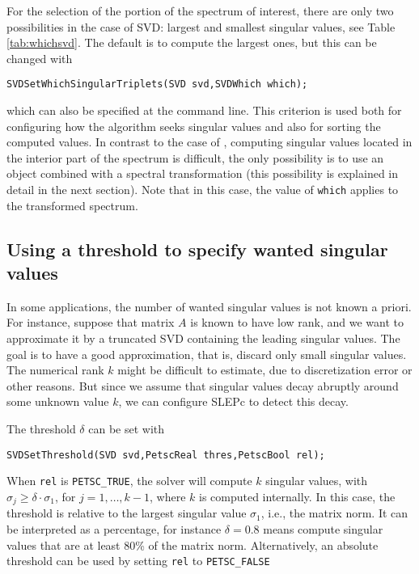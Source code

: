 For the selection of the portion of the spectrum of interest, there are only two possibilities in the case of SVD: largest and smallest singular values, see Table \ref{tab:whichsvd}. The default is to compute the largest ones, but this can be changed with
        \begin{Verbatim}[fontsize=\small]
        SVDSetWhichSingularTriplets(SVD svd,SVDWhich which);
        \end{Verbatim}
which can also be specified at the command line. This criterion is used both for configuring how the algorithm seeks singular values and also for sorting the computed values. In contrast to the case of , computing singular values located in the interior part of the spectrum is difficult, the only possibility is to use an  object combined with a spectral transformation (this possibility is explained in detail in the next section). Note that in this case, the value of \Verb!which! applies to the transformed spectrum.

\subsection{\label{sec:thres}Using a threshold to specify wanted singular values}

In some applications, the number of wanted singular values is not known a priori. For instance, suppose that matrix $A$ is known to have low rank, and we want to approximate it by a truncated SVD containing the leading singular values. The goal is to have a good approximation, that is, discard only small singular values. The numerical rank $k$ might be difficult to estimate, due to discretization error or other reasons. But since we assume that singular values decay abruptly around some unknown value $k$, we can configure SLEPc to detect this decay.

The threshold $\delta$ can be set with
        \begin{Verbatim}[fontsize=\small]
        SVDSetThreshold(SVD svd,PetscReal thres,PetscBool rel);
        \end{Verbatim}
When \texttt{rel} is \texttt{PETSC\_TRUE}, the solver will compute $k$ singular values, with $\sigma_j\geq\delta\cdot\sigma_1$, for $j=1,\dots,k-1$, where $k$ is computed internally. In this case, the threshold is relative to the largest singular value $\sigma_1$, i.e., the matrix norm. It can be interpreted as a percentage, for instance $\delta=0.8$ means compute singular values that are at least 80\% of the matrix norm. Alternatively, an absolute threshold can be used by setting \texttt{rel} to \texttt{PETSC\_FALSE}

